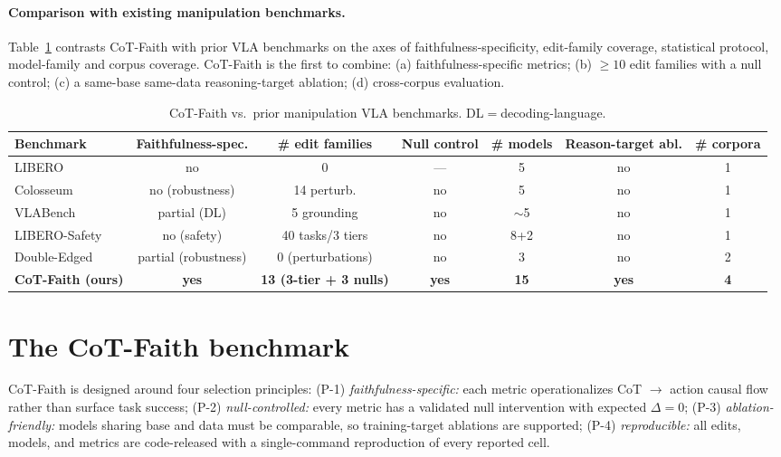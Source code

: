 \documentclass{article}
\begin{document}
\paragraph{Comparison with existing manipulation benchmarks.} Table~\ref{tab:compare} contrasts CoT-Faith with prior VLA benchmarks on the axes of faithfulness-specificity, edit-family coverage, statistical protocol, model-family and corpus coverage. CoT-Faith is the first to combine: (a) faithfulness-specific metrics; (b) $\geq 10$ edit families with a null control; (c) a same-base same-data reasoning-target ablation; (d) cross-corpus evaluation.

\begin{table}[t]
\centering\small
\caption{CoT-Faith vs.\ prior manipulation VLA benchmarks. DL$=$decoding-language.}
\label{tab:compare}
\begin{tabular}{l c c c c c c}
\toprule
Benchmark & Faithfulness-spec. & \# edit families & Null control & \# models & Reason-target abl. & \# corpora \\
\midrule
LIBERO \citep{libero} & no & 0 & --- & 5 & no & 1 \\
Colosseum \citep{colosseum} & no (robustness) & 14 perturb. & no & 5 & no & 1 \\
VLABench \citep{vlabench} & partial (DL) & 5 grounding & no & $\sim$5 & no & 1 \\
LIBERO-Safety \citep{liberosafety} & no (safety) & 40 tasks/3 tiers & no & 8+2 & no & 1 \\
Double-Edged \citep{doubleedged} & partial (robustness) & 0 (perturbations) & no & 3 & no & 2 \\
\midrule
\textbf{CoT-Faith (ours)} & \textbf{yes} & \textbf{13 (3-tier + 3 nulls)} & \textbf{yes} & \textbf{15} & \textbf{yes} & \textbf{4} \\
\bottomrule
\end{tabular}
\end{table}

\section{The CoT-Faith benchmark}
\label{sec:benchmark}

CoT-Faith is designed around four selection principles: (P-1) \emph{faithfulness-specific:} each metric operationalizes CoT $\to$ action causal flow rather than surface task success; (P-2) \emph{null-controlled:} every metric has a validated null intervention with expected $\Delta\!=\!0$; (P-3) \emph{ablation-friendly:} models sharing base and data must be comparable, so training-target ablations are supported; (P-4) \emph{reproducible:} all edits, models, and metrics are code-released with a single-command reproduction of every reported cell.
\end{document}
